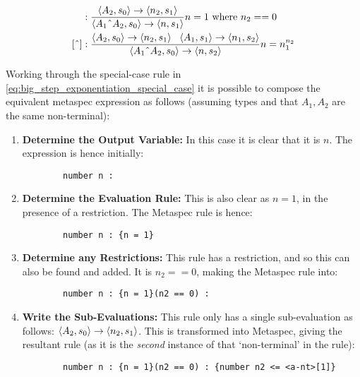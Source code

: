 \begin{align}
    [\string^] &: \frac{\la A_2, s_0 \ra \to \la n_2, s_1 \ra}
    {\la A_1 \string^ A_2, s_0 \ra \to \la n, s_1 \ra} n = 1 \text{ where } n_2 == 0 \label{eq:big_step_exponentiation_special_case} \\
    [\string^] &: \frac{\la A_2, s_0 \ra \to \la n_2, s_1 \ra \;\;\; \la A_1, s_1 \ra \to \la n_1, s_2 \ra}{\la A_1 \string^ A_2, s_0 \ra \to \la n, s_2 \ra} n = n_1^{n_2} \label{eq:big_step_exponentiation_base_case}
\end{align}

Working through the special-case rule in \autoref{eq:big_step_exponentiation_special_case} it is possible to compose the equivalent \gls{metaspec} expression as follows (assuming types and that $A_1, A_2$ are the same non-terminal): 
\begin{enumerate}
    \item \textbf{Determine the Output Variable:} In this case it is clear that it is $n$. 
    The expression is hence initially:
    \begin{verbatim}
        number n : 
    \end{verbatim}
    \item \textbf{Determine the Evaluation Rule:} This is also clear as $n = 1$, in the presence of a restriction.
    The Metaspec rule is hence:
    \begin{verbatim}
        number n : {n = 1}
    \end{verbatim}
    \item \textbf{Determine any Restrictions:} This rule has a restriction, and so this can also be found and added. 
    It is $n_2 == 0$, making the Metaspec rule into:
    \begin{verbatim}
        number n : {n = 1}(n2 == 0) : 
    \end{verbatim}
    \item \textbf{Write the Sub-Evaluations:} This rule only has a single sub-evaluation as follows: $\langle A_2, s_0 \rangle \to \langle n_2, s_1 \rangle$.
    This is transformed into Metaspec, giving the resultant rule (as it is the \textit{second} instance of that `non-terminal' in the rule):
    \begin{verbatim}
        number n : {n = 1}(n2 == 0) : {number n2 <= <a-nt>[1]}
    \end{verbatim}
\end{enumerate}

